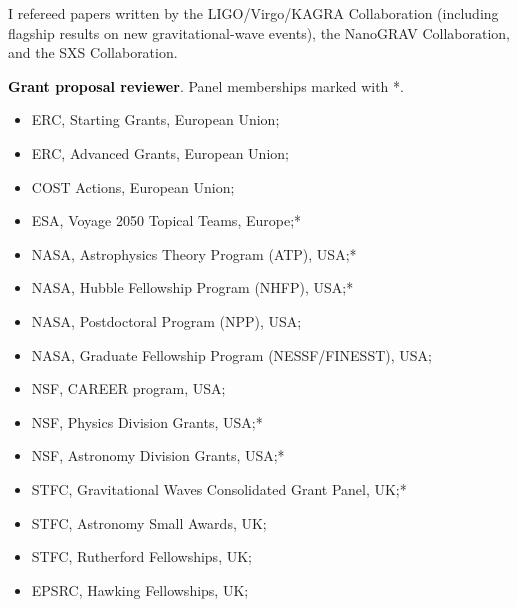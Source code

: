 \vspace{0.2cm}

I refereed papers written by the LIGO/Virgo/KAGRA Collaboration (including flagship results on new gravitational-wave events), the NanoGRAV Collaboration, and the SXS Collaboration.









\vspace{0.2cm}
 \textbf{\textcolor{black}{Grant proposal reviewer}}. Panel memberships marked with *.\vspace{0.1cm}\\
\hspace*{0.35cm}%
\begin{minipage}[t]{\dimexpr(\textwidth-0.4cm-0.2cm)/2\relax}
\raggedright
\begin{itemize}[label=$\circ$,leftmargin=1em,labelsep=0.4em]
\item ERC, Starting Grants, European Union;
\item ERC, Advanced Grants, European Union;
\item COST Actions, European Union;
\item ESA, Voyage 2050 Topical Teams, Europe;*
\item NASA, Astrophysics Theory Program (ATP), USA;*
\item NASA, Hubble Fellowship Program (NHFP), USA;*
\item NASA, Postdoctoral Program (NPP), USA;
\item NASA, Graduate Fellowship Program (NESSF/FINESST), USA;
\item NSF, CAREER program, USA;
\item NSF, Physics Division Grants, USA;*
\item NSF, Astronomy Division Grants, USA;*
\item STFC, Gravitational Waves Consolidated Grant Panel, UK;*
\item STFC, Astronomy Small Awards, UK;
\item STFC, Rutherford Fellowships, UK;
\item EPSRC, Hawking Fellowships, UK;
\end{itemize}
\end{minipage}%
\hspace{0.2cm}%
